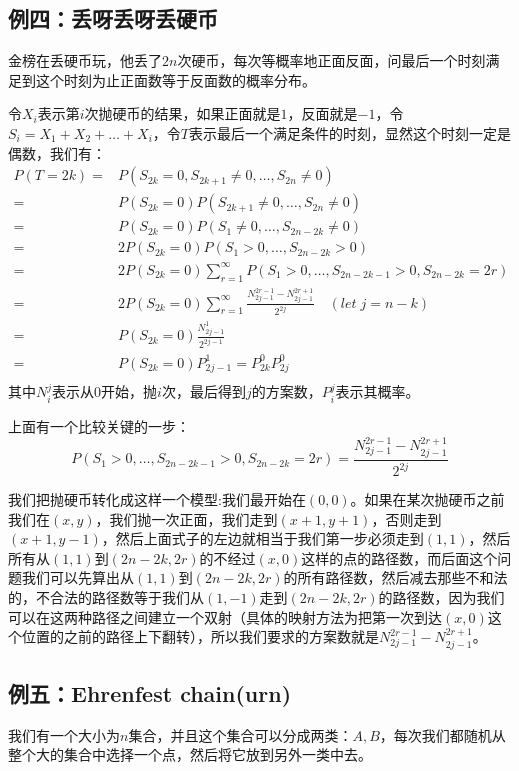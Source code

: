 		\subsection{例四：丢呀丢呀丢硬币}
		金榜在丢硬币玩，他丢了$2n$次硬币，每次等概率地正面反面，问最后一个时刻满足到这个时刻为止正面数等于反面数的概率分布。
		
		\proof 令$X_i$表示第$i$次抛硬币的结果，如果正面就是$1$，反面就是$-1$，令$S_i=X_1+X_2+\dots+X_i$，令$T$表示最后一个满足条件的时刻，显然这个时刻一定是偶数，我们有：
		\[ \begin{split}
			P(T=2k) = & P(S_{2k}=0,S_{2k+1}\neq0,\dots,S_{2n}\neq0) \\
					= & P(S_{2k}=0)P(S_{2k+1}\neq0,\dots,S_{2n}\neq0) \\
					= & P(S_{2k}=0)P(S_1\neq0,\dots,S_{2n-2k}\neq0) \\
					= & 2P(S_{2k}=0)P(S_1>0,\dots,S_{2n-2k}>0) \\
					= & 2P(S_{2k}=0)\sum_{r=1}^{\infty}P(S_1>0,\dots,S_{2n-2k-1}>0,S_{2n-2k}=2r) \\
					= & 2P(S_{2k}=0)\sum_{r=1}^{\infty}\frac{N_{2j-1}^{2r-1}-N_{2j-1}^{2r+1}}{2^{2j}}	\quad (let \; j = n-k)\\
					= & P(S_{2k}=0)\frac{N_{2j-1}^{1}}{2^{2j-1}} \\
					= & P(S_{2k}=0)P_{2j-1}^{1} = P_{2k}^{0}P_{2j}^{0} \\
		\end{split}	\]
		其中$N_i^j$表示从$0$开始，抛$i$次，最后得到$j$的方案数，$P_i^j$表示其概率。
		
		上面有一个比较关键的一步：
		$$
		P(S_1>0,\dots,S_{2n-2k-1}>0,S_{2n-2k}=2r) = \frac{N_{2j-1}^{2r-1}-N_{2j-1}^{2r+1}}{2^{2j}}
		$$
		
		我们把抛硬币转化成这样一个模型:我们最开始在$(0,0)$。如果在某次抛硬币之前我们在$(x,y)$，我们抛一次正面，我们走到$(x+1,y+1)$，否则走到$(x+1,y-1)$，然后上面式子的左边就相当于我们第一步必须走到$(1,1)$，然后所有从$(1,1)$到$(2n-2k,2r)$的不经过$(x,0)$这样的点的路径数，而后面这个问题我们可以先算出从$(1,1)$到$(2n-2k,2r)$的所有路径数，然后减去那些不和法的，不合法的路径数等于我们从$(1,-1)$走到$(2n-2k,2r)$的路径数，因为我们可以在这两种路径之间建立一个双射（具体的映射方法为把第一次到达$(x,0)$这个位置的之前的路径上下翻转），所以我们要求的方案数就是$N_{2j-1}^{2r-1}-N_{2j-1}^{2r+1}$。
		
		\subsection{例五：Ehrenfest chain(urn)}
		我们有一个大小为$n$集合，并且这个集合可以分成两类：$A, B$，每次我们都随机从整个大的集合中选择一个点，然后将它放到另外一类中去。
		

